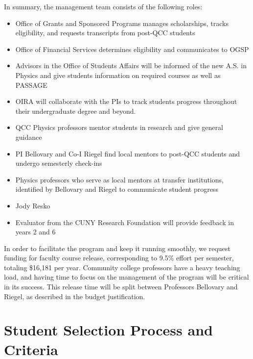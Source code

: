 \documentclass[12pt]{article}
\newcommand\new[1]{{\color{blue}#1}}
\begin{document}
In summary, the management team consists of the following roles:
\begin{itemize}
\setlength{\itemsep}{-\parsep}
\setlength{\topsep}{-\parsep}
\setlength{\partopsep}{-\parsep}
	\item Office of Grants and Sponsored Programs manages scholarships, tracks eligibility, and requests transcripts from post-QCC students
	\item Office of Financial Services determines eligibility and communicates to OGSP
		\item Advisors in the Office of Students Affairs will be informed of the new A.S. in Physics and give students information on required courses as well as PASSAGE
	\item OIRA will collaborate with the PIs to track students progress throughout their undergraduate degree and beyond.   
	\item QCC Physics professors mentor students in research and give general guidance
	\item PI Bellovary and Co-I Riegel find local mentors to post-QCC students and undergo semesterly check-ins
	\item Physics professors who serve as local mentors at transfer institutions, identified by Bellovary and Riegel to communicate student progress
	\item \new{ Jody Resko}
	\item Evaluator from the CUNY Research Foundation will provide feedback in years 2 and 6
\end{itemize}	

In order to facilitate the program and keep it running smoothly, we request funding for faculty course release, corresponding to 9.5\% effort per semester, totaling \$16,181 per year.  Community college professors have a heavy teaching load, and having time to focus on the management of the program will be critical in its success.  This release time will be split between Professors Bellovary and Riegel, as described in the budget justification.

\vspace{-5mm}

\section{\large{Student Selection Process and Criteria}}
\vspace{-3mm}
\end{document}
